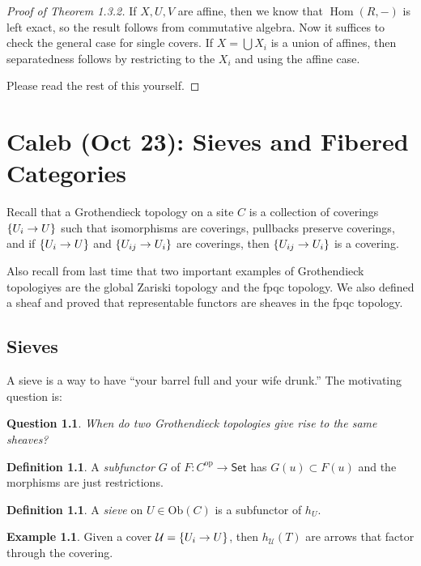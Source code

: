 \documentclass[leqno, openany]{memoir}
\newtheorem{quest}[thm]{Question}
\theoremstyle{definition}
\newtheorem{defn}[thm]{Definition}
\newtheorem{exm}[thm]{Example}
\theoremstyle{remark}
\theoremstyle{plain}
\theoremstyle{definition}
\theoremstyle{remark}
\newcommand{\mc}[1]{\mathcal{#1}}
\newcommand{\mr}[1]{\mathrm{#1}}
\newcommand{\ms}[1]{\mathsf{#1}}
\DeclareMathOperator{\Hom}{Hom}
\begin{document}
\begin{proof}[Proof of Theorem 1.3.2]
    If $X,U,V$ are affine, then we know that $\Hom(R,-)$ is left exact, so the result follows from commutative algebra. Now it suffices to check the general case for single covers. If $X = \bigcup X_i$ is a union of affines, then separatedness follows by restricting to the $X_i$ and using the affine case.

    Please read the rest of this yourself.
\end{proof}

\chapter{Caleb (Oct 23): Sieves and Fibered Categories}%
\label{cha:caleb_oct_23_sieves_and_fibered_categories}

Recall that a Grothendieck topology on a site $C$ is a collection of coverings $\qty{U_i \to U}$ such that isomorphisms are coverings, pullbacks preserve coverings, and if $\qty{U_i \to U}$ and $\qty{U_{ij} \to U_i}$ are coverings, then $\qty{U_{ij} \to U_i}$ is a covering.

Also recall from last time that two important examples of Grothendieck topologiyes are the global Zariski topology and the fpqc topology. We also defined a sheaf and proved that representable functors are sheaves in the fpqc topology.

\section{Sieves}%
\label{sec:sieves}

A sieve is a way to have ``your barrel full and your wife drunk.'' The motivating question is:

\begin{quest}
    When do two Grothendieck topologies give rise to the same sheaves?
\end{quest}

\begin{defn}
    A \textit{subfunctor} $G$ of $F \colon C^{\mr{op}} \to \ms{Set}$ has $G(u) \subset F(u)$ and the morphisms are just restrictions. 
\end{defn}

\begin{defn}
    A \textit{sieve} on $U \in \mr{Ob}(C)$ is a subfunctor of $h_U$. 
\end{defn}

\begin{exm}
    Given a cover $\mc{U} = \qty{U_i \to U}$, then $h_{\mc{U}}(T)$ are arrows that factor through the covering.
\end{exm}
\end{document}
